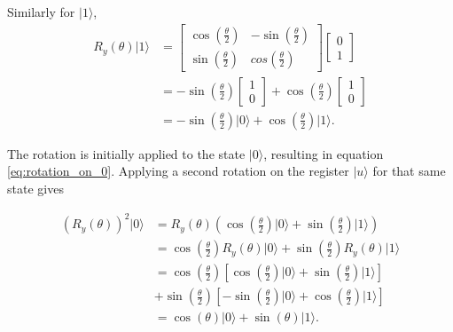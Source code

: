 \noindent Similarly for $\vert 1 \rangle$,
\begin{align}
    R_y\left(\theta\right) \vert 1 \rangle &= 
    \begin{bmatrix}
        \cos\left(\frac{\theta}{2}\right) & -\sin\left(\frac{\theta}{2}\right)\\
        \sin\left(\frac{\theta}{2}\right) & cos\left(\frac{\theta}{2}\right)
    \end{bmatrix}
    \begin{bmatrix}
    0 \\ 1 
    \end{bmatrix}\\
    &= -\sin\left(\frac{\theta}{2}\right)    
    \begin{bmatrix}
    1 \\ 0 
    \end{bmatrix}
    + \cos\left(\frac{\theta}{2}\right)
    \begin{bmatrix}
    1 \\ 0 
    \end{bmatrix}\\
    &= -\sin\left(\frac{\theta}{2}\right) \vert 0 \rangle + \cos\left(\frac{\theta}{2}\right) \vert 1 \rangle.
        \label{eq:rotation_on_1}
\end{align}

The rotation is initially applied to the state $\vert 0 \rangle$, resulting in equation \eqref{eq:rotation_on_0}. Applying a second rotation on the register $\vert u \rangle$ for that same state gives

\begin{align}
    \left(R_y\left(\theta \right)\right)^2 \vert 0 \rangle 
    &=
    R_y\left(\theta \right) \left( \cos\left(\frac{\theta}{2}\right) \vert 0 \rangle + \sin\left(\frac{\theta}{2}\right) \vert 1 \rangle\right) \\
    &=
    \cos\left(\frac{\theta}{2}\right) R_y\left(\theta \right)\vert 0 \rangle + \sin\left(\frac{\theta}{2}\right) R_y\left(\theta \right)\vert 1 \rangle\\
    &=
    \cos\left(\frac{\theta}{2}\right)\left[\cos\left(\frac{\theta}{2}\right)\vert 0 \rangle + \sin\left(\frac{\theta}{2}\right)\vert 1 \rangle \right]\\
    &+ \sin\left(\frac{\theta}{2}\right)\left[-\sin\left(\frac{\theta}{2}\right)\vert 0 \rangle + \cos\left(\frac{\theta}{2}\right)\vert 1 \rangle \right]\\
    &= \cos\left(\theta\right)\vert 0 \rangle + \sin\left(\theta\right)\vert 1 \rangle 
    \label{eq:second_rotation}.
\end{align}


